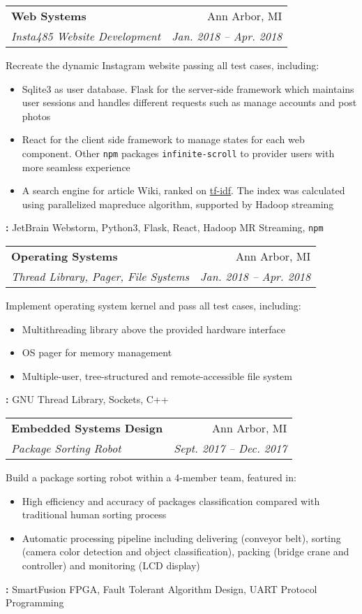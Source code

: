 \documentclass[letterpaper,10pt]{article}
\makeatletter
\newcommand{\resumeSubheading}[5]{
      \vspace{-1pt}\item
        \begin{tabular*}{0.97\textwidth}{l@{\extracolsep{\fill}}r}
          \textbf{#1} & #2 \\
          \textit{\small#3} & \textit{\small #4} \\
        \end{tabular*}\vspace{#5 pt}
    }
\newcommand{\methodsTools}[1]{\textbf{\faCog: } #1}
\makeatother
\begin{document}
        \resumeSubheading{Web Systems}{Ann Arbor, MI}{Insta485 Website Development}{Jan. 2018 -- Apr. 2018}{0}
        Recreate the dynamic Instagram website passing all test cases, including:
        \begin{itemize}
          \item Sqlite3 as user database. Flask for the server-side framework which maintains user sessions and handles different requests such as manage accounts and post photos
          \item React for the client side framework to manage states for each web component. Other \texttt{npm} packages \texttt{infinite-scroll} to provider users with more seamless experience
          \item A search engine for article Wiki, ranked on \href{https://en.wikipedia.org/wiki/Tf%E2%80%93idf}{tf-idf}. The index was calculated using parallelized mapreduce algorithm, supported by Hadoop streaming
        \end{itemize}
        \methodsTools{JetBrain Webstorm, Python3, Flask, React, Hadoop MR Streaming, \texttt{npm}}

        \resumeSubheading{Operating Systems}{Ann Arbor, MI}{Thread Library, Pager, File Systems}{Jan. 2018 -- Apr. 2018}{0}
        Implement operating system kernel and pass all test cases, including:
        \begin{itemize}
          \item Multithreading library above the provided hardware interface
          \item OS pager for memory management
          \item Multiple-user, tree-structured and remote-accessible file system          
        \end{itemize}
        \methodsTools{GNU Thread Library, Sockets, C++}

        \resumeSubheading{Embedded Systems Design}{Ann Arbor, MI}{Package Sorting Robot}{Sept. 2017 -- Dec. 2017}{0}
        Build a package sorting robot within a 4-member team, featured in:
        \begin{itemize}
          \item High efficiency and accuracy of packages classification compared with traditional human sorting process
          \item Automatic processing pipeline including delivering (conveyor belt), sorting (camera color detection and object classification), packing (bridge crane and controller) and monitoring (LCD display)
        \end{itemize}
        \methodsTools{SmartFusion FPGA, Fault Tolerant Algorithm Design, UART Protocol Programming}
\end{document}
